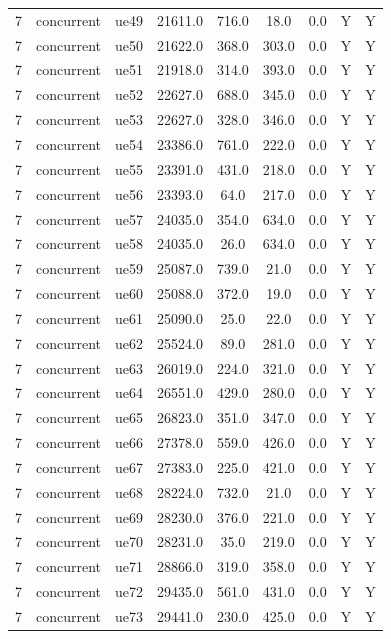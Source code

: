 \begin{table}[ht]
\begin{tabular}{|c|c|c|c|c|c|c|c|c|}
7 & concurrent & ue49 & 21611.0 & 716.0 & 18.0 & 0.0 & Y & Y \\
7 & concurrent & ue50 & 21622.0 & 368.0 & 303.0 & 0.0 & Y & Y \\
7 & concurrent & ue51 & 21918.0 & 314.0 & 393.0 & 0.0 & Y & Y \\
7 & concurrent & ue52 & 22627.0 & 688.0 & 345.0 & 0.0 & Y & Y \\
7 & concurrent & ue53 & 22627.0 & 328.0 & 346.0 & 0.0 & Y & Y \\
7 & concurrent & ue54 & 23386.0 & 761.0 & 222.0 & 0.0 & Y & Y \\
7 & concurrent & ue55 & 23391.0 & 431.0 & 218.0 & 0.0 & Y & Y \\
7 & concurrent & ue56 & 23393.0 & 64.0 & 217.0 & 0.0 & Y & Y \\
7 & concurrent & ue57 & 24035.0 & 354.0 & 634.0 & 0.0 & Y & Y \\
7 & concurrent & ue58 & 24035.0 & 26.0 & 634.0 & 0.0 & Y & Y \\
7 & concurrent & ue59 & 25087.0 & 739.0 & 21.0 & 0.0 & Y & Y \\
7 & concurrent & ue60 & 25088.0 & 372.0 & 19.0 & 0.0 & Y & Y \\
7 & concurrent & ue61 & 25090.0 & 25.0 & 22.0 & 0.0 & Y & Y \\
7 & concurrent & ue62 & 25524.0 & 89.0 & 281.0 & 0.0 & Y & Y \\
7 & concurrent & ue63 & 26019.0 & 224.0 & 321.0 & 0.0 & Y & Y \\
7 & concurrent & ue64 & 26551.0 & 429.0 & 280.0 & 0.0 & Y & Y \\
7 & concurrent & ue65 & 26823.0 & 351.0 & 347.0 & 0.0 & Y & Y \\
7 & concurrent & ue66 & 27378.0 & 559.0 & 426.0 & 0.0 & Y & Y \\
7 & concurrent & ue67 & 27383.0 & 225.0 & 421.0 & 0.0 & Y & Y \\
7 & concurrent & ue68 & 28224.0 & 732.0 & 21.0 & 0.0 & Y & Y \\
7 & concurrent & ue69 & 28230.0 & 376.0 & 221.0 & 0.0 & Y & Y \\
7 & concurrent & ue70 & 28231.0 & 35.0 & 219.0 & 0.0 & Y & Y \\
7 & concurrent & ue71 & 28866.0 & 319.0 & 358.0 & 0.0 & Y & Y \\
7 & concurrent & ue72 & 29435.0 & 561.0 & 431.0 & 0.0 & Y & Y \\
7 & concurrent & ue73 & 29441.0 & 230.0 & 425.0 & 0.0 & Y & Y \\

\end{tabular}
\end{table}
